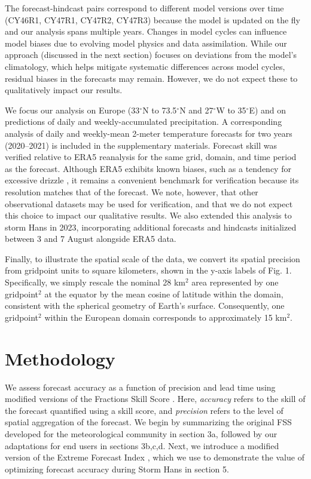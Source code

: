\documentclass[preprint,12pt,authoryear]{elsarticle}
\begin{document}
The forecast-hindcast pairs correspond to different model versions over time (CY46R1, CY47R1, CY47R2, CY47R3) because the model is updated on the fly and our analysis spans multiple years. Changes in model cycles can influence model biases due to evolving model physics and data assimilation. While our approach (discussed in the next section) focuses on deviations from the model's climatology, which helps mitigate systematic differences across model cycles, residual biases in the forecasts may remain. However, we do not expect these to qualitatively impact our results.


We focus our analysis on Europe (33$^{\circ}$N to 73.5$^{\circ}$N and 27$^{\circ}$W to 35$^{\circ}$E) and on predictions of daily and weekly-accumulated precipitation. A corresponding analysis of daily and weekly-mean 2-meter temperature forecasts for two years (2020--2021) is included in the supplementary materials. Forecast skill was verified relative to ERA5 reanalysis \citep{Hersbach2020} for the same grid, domain, and time period as the forecast. Although ERA5 exhibits known biases, such as a tendency for excessive drizzle \citep{Lavers2022}, it remains a convenient benchmark for verification because its resolution matches that of the forecast. We note, however, that other observational datasets may be used for verification, and that we do not expect this choice to impact our qualitative results. We also extended this analysis to storm Hans in 2023, incorporating additional forecasts and hindcasts initialized between 3 and 7 August alongside ERA5 data.


Finally, to illustrate the spatial scale of the data, we convert its spatial precision from gridpoint units to square kilometers, shown in the y-axis labels of Fig. 1. Specifically, we simply rescale the nominal 28 km$^2$ area represented by one gridpoint$^2$ at the equator by the mean cosine of latitude within the domain, consistent with the spherical geometry of Earth's surface. Consequently, one gridpoint$^2$ within the European domain corresponds to approximately 15 km$^2$.


\section{Methodology}

We assess forecast accuracy as a function of precision and lead time using modified versions of the Fractions Skill Score \citep[FSS,][]{RobertsLean2008}. Here, \textit{accuracy} refers to the skill of the forecast quantified using a skill score, and \textit{precision} refers to the level of spatial aggregation of the forecast. We begin by summarizing the original FSS developed for the meteorological community in section 3a, followed by our adaptations for end users in sections 3b,c,d. Next, we introduce a modified version of the Extreme Forecast Index \citep[EFI,][]{Lalaurette2003}, which we use to demonstrate the value of optimizing forecast accuracy during Storm Hans in section 5.
\end{document}
